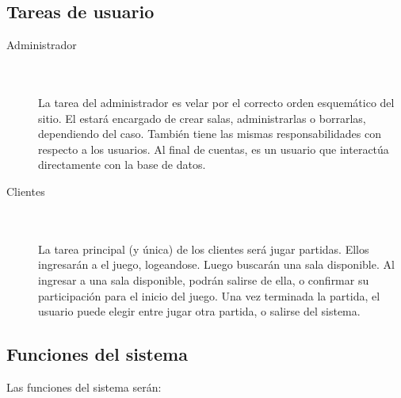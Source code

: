 \documentclass[a4paper,11pt]{article}
\begin{document}
\subsection{Tareas de usuario}

\begin{description}
	\item[Administrador] \hfill \\ \\
	La tarea del administrador es velar por el correcto orden esquemático
	del sitio. El estará encargado de crear salas, administrarlas o 
	borrarlas, dependiendo del caso. También tiene las mismas 
	responsabilidades con respecto a los usuarios. Al final de cuentas,
	es un usuario que interactúa directamente con la base de datos.

	\item[Clientes] \hfill \\ \\
	La tarea principal (y única) de los clientes será jugar partidas. Ellos
	ingresarán a el juego, logeandose. Luego buscarán una sala disponible.
	Al ingresar a una sala disponible, podrán salirse de ella, o confirmar
	su participación para el inicio del juego. Una vez terminada la partida,
	el usuario puede elegir entre jugar otra partida, o salirse del sistema.
	
\end{description}
\newpage
	

\subsection{Funciones del sistema}
Las funciones del sistema serán:\\
\end{document}
